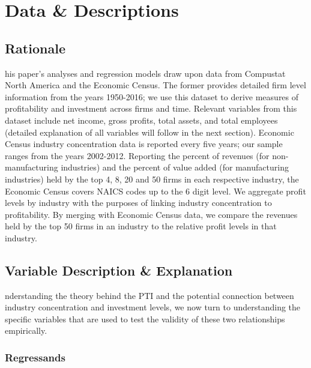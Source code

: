 %
%
\let\textcircled=\pgftextcircled
\chapter{Data \& Descriptions}
\label{chap:2}

\section{Rationale}
\label{sec:sec01}

his paper’s analyses and regression models draw upon data from Compustat North America and the Economic Census. The former provides detailed firm level information from the years 1950-2016; we use this dataset to derive measures of profitability and investment across firms and time. Relevant variables from this dataset include net income, gross profits, total assets, and total employees (detailed explanation of all variables will follow in the next section). Economic Census industry concentration data is reported every five years; our sample ranges from the years 2002-2012. Reporting the percent of revenues (for non-manufacturing industries) and the percent of value added (for manufacturing industries) held by the top 4, 8, 20 and 50 firms in each respective industry, the Economic Census covers NAICS codes up to the 6 digit level. We aggregate profit levels by industry with the purposes of linking industry concentration to profitability. By merging with Economic Census data, we compare the revenues held by the top 50 firms in an industry to the relative profit levels in that industry. \\


\section{Variable Description \& Explanation}
\label{sec:sec02}

nderstanding the theory behind the PTI and the potential connection between industry concentration and investment levels, we now turn to understanding the specific variables that are used to test the validity of these two relationships empirically.

\subsection{Regressands}
\label{subsec:subsec01}

